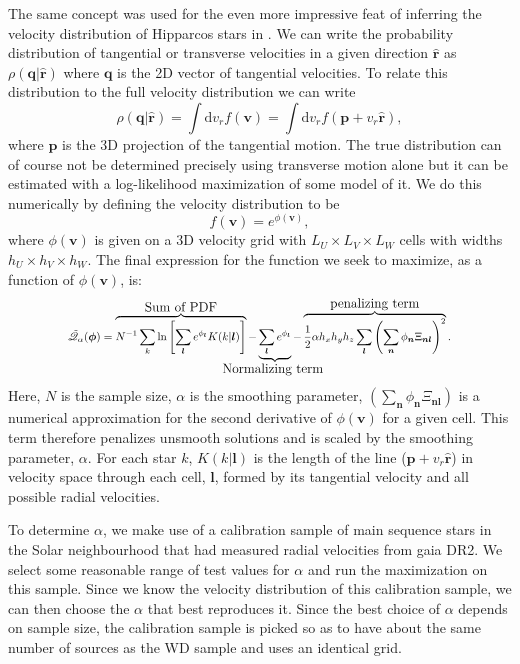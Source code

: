 The same concept was used for the even more impressive feat of inferring the velocity distribution of Hipparcos stars in \cite{dehnen:98a}. We can write the probability distribution of tangential or transverse velocities in a given direction $\hat{\bm{r}}$ as $\rho(\bm{q|\hat{\bm{r}}})$ where $\bm{q}$ is the 2D vector of tangential velocities. To relate this distribution to the full velocity distribution we can write
\begin{equation}
    \rho(\bm{q|\hat{\bm{r}}}) = \int \mathrm{d}v_r f(\bm{v}) = \int \mathrm{d}v_r f(\bm{p} + v_r\hat{\bm{r}}),
\end{equation}
where $\bm{p}$ is the 3D projection of the tangential motion. The true distribution can of course not be determined precisely using transverse motion alone but it can be estimated with a log-likelihood maximization of some model of it. We do this numerically by defining the velocity distribution to be
\begin{equation}
    f(\bm{v}) = e^{\phi(\bm{v})},
\end{equation}
where $\phi(\bm{v})$ is given on a 3D velocity grid with $L_U\times L_V\times L_W$ cells with widths $h_U\times h_V\times h_W$. The final expression for the function we seek to maximize, as a function of $\phi(\bm{v})$, is: 
\begin{equation}\label{eq:mple}
    \scalemath{0.8}{\tilde{\mathscr{Q}}_\alpha(\bm{\phi}) = 
    \overbrace{N^{-1}\sum_{k} \ln \left[\sum_{\bm{l}}e^{\phi_{\bm{l}}}K(k|\bm{l})\right]}^\text{\large Sum of PDF} - 
    \underbrace{\sum_{\bm{l}}e^{\phi_{\bm{l}}}}_\text{\large \hbox to 0cm{\hss Normalizing term \hss}} - 
    \overbrace{\frac{1}{2}\alpha h_xh_yh_z\sum_{\bm{l}}\left(\sum_{\bm{n}} \phi_{\bm{n}}\Xi_{\bm{n}\bm{l}}\right)^2}^\text{\large penalizing term}.
    }
\end{equation}
Here, $N$ is the sample size, $\alpha$ is the smoothing parameter, $\left(\sum_{\bm{n}} \phi_{\bm{n}}\Xi_{\bm{n}\bm{l}}\right)$ is a numerical approximation for the second derivative of $\phi(\bm{v})$ for a given cell. This term therefore penalizes unsmooth solutions and is scaled by the smoothing parameter, $\alpha$. For each star $k$, $K(k|\bm{l})$ is the length of the line ($\bm{p} + v_r\hat{\bm{r}}$) in velocity space through each cell, $\bm{l}$, formed by its tangential velocity and all possible radial velocities. 

To determine $\alpha$, we make use of a calibration sample of main sequence stars in the Solar neighbourhood that had measured radial velocities from gaia DR2. We select some reasonable range of test values for $\alpha$ and run the maximization on this sample. Since we know the velocity distribution of this calibration sample, we can then choose the $\alpha$ that best reproduces it. Since the best choice of $\alpha$ depends on sample size, the calibration sample is picked so as to have about the same number of sources as the WD sample and uses an identical grid.

